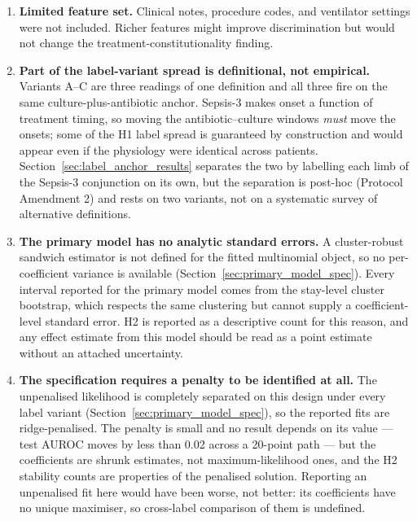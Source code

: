 \begin{enumerate}
    \item \textbf{Limited feature set.} Clinical notes, procedure codes, and
    ventilator settings were not included. Richer features might improve
    discrimination but would not change the treatment-constitutionality finding.

    \item \textbf{Part of the label-variant spread is definitional, not
    empirical.} Variants A--C are three readings of one definition and all
    three fire on the same culture-plus-antibiotic anchor. Sepsis-3 makes onset
    a function of treatment timing, so moving the antibiotic--culture windows
    \emph{must} move the onsets; some of the H1 label spread is guaranteed by
    construction and would appear even if the physiology were identical across
    patients. Section~\ref{sec:label_anchor_results} separates the two by
    labelling each limb of the Sepsis-3 conjunction on its own, but the
    separation is post-hoc (Protocol Amendment 2) and rests on two variants,
    not on a systematic survey of alternative definitions.

    \item \textbf{The primary model has no analytic standard errors.} A
    cluster-robust sandwich estimator is not defined for the fitted multinomial
    object, so no per-coefficient variance is available
    (Section~\ref{sec:primary_model_spec}). Every interval reported for the
    primary model comes from the stay-level cluster bootstrap, which respects
    the same clustering but cannot supply a coefficient-level standard error.
    H2 is reported as a descriptive count for this reason, and any effect
    estimate from this model should be read as a point estimate without an
    attached uncertainty.

    \item \textbf{The specification requires a penalty to be identified at all.}
    The unpenalised likelihood is completely separated on this design under
    every label variant (Section~\ref{sec:primary_model_spec}), so the reported
    fits are ridge-penalised. The penalty is small and no result depends on its
    value --- test AUROC moves by less than 0.02 across a 20-point path --- but
    the coefficients are shrunk estimates, not maximum-likelihood ones, and the
    H2 stability counts are properties of the penalised solution. Reporting an
    unpenalised fit here would have been worse, not better: its coefficients
    have no unique maximiser, so cross-label comparison of them is undefined.


\end{enumerate}
